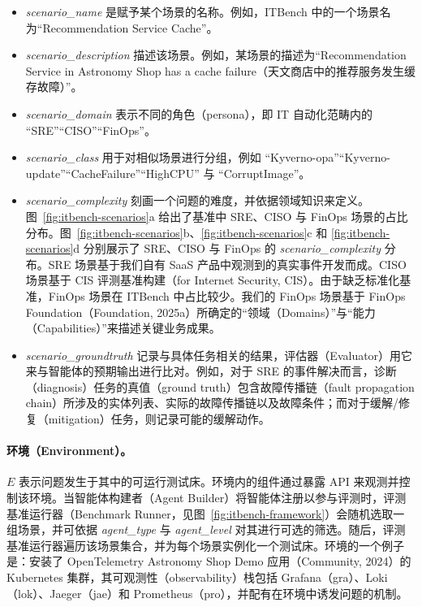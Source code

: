 \begin{itemize}
\item \emph{scenario\_name} 是赋予某个场景的名称。例如，ITBench 中的一个场景名为“Recommendation Service Cache”。
\item \emph{scenario\_description} 描述该场景。例如，某场景的描述为“Recommendation Service in Astronomy Shop has a cache failure（天文商店中的推荐服务发生缓存故障）”。
\item \emph{scenario\_domain} 表示不同的角色（persona），即 IT 自动化范畴内的 “SRE”“CISO”“FinOps”。
\item \emph{scenario\_class} 用于对相似场景进行分组，例如 “Kyverno-opa”“Kyverno-update”“CacheFailure”“HighCPU” 与 “CorruptImage”。
\item \emph{scenario\_complexity} 刻画一个问题的难度，并依据领域知识来定义。图~\ref{fig:itbench-scenarios}a 给出了基准中 SRE、CISO 与 FinOps 场景的占比分布。图~\ref{fig:itbench-scenarios}b、\ref{fig:itbench-scenarios}c 和 \ref{fig:itbench-scenarios}d 分别展示了 SRE、CISO 与 FinOps 的 \emph{scenario\_complexity} 分布。SRE 场景基于我们自有 SaaS 产品中观测到的真实事件开发而成。CISO 场景基于 CIS 评测基准构建（for Internet Security, CIS）。由于缺乏标准化基准，FinOps 场景在 ITBench 中占比较少。我们的 FinOps 场景基于 FinOps Foundation（Foundation, 2025a）所确定的“领域（Domains）”与“能力（Capabilities）”来描述关键业务成果。
\item \emph{scenario\_groundtruth} 记录与具体任务相关的结果，评估器（Evaluator）用它来与智能体的预期输出进行比对。例如，对于 SRE 的事件解决而言，诊断（diagnosis）任务的真值（ground truth）包含故障传播链（fault propagation chain）所涉及的实体列表、实际的故障传播链以及故障条件；而对于缓解/修复（mitigation）任务，则记录可能的缓解动作。
\end{itemize}

\paragraph{环境（Environment）。} $E$ 表示问题发生于其中的可运行测试床。环境内的组件通过暴露 API 来观测并控制该环境。当智能体构建者（Agent Builder）将智能体注册以参与评测时，评测基准运行器（Benchmark Runner，见图~\ref{fig:itbench-framework}）会随机选取一组场景，并可依据 \emph{agent\_type} 与 \emph{agent\_level} 对其进行可选的筛选。随后，评测基准运行器遍历该场景集合，并为每个场景实例化一个测试床。环境的一个例子是：安装了 OpenTelemetry Astronomy Shop Demo 应用（Community, 2024）的 Kubernetes 集群，其可观测性（observability）栈包括 Grafana（gra）、Loki（lok）、Jaeger（jae）和 Prometheus（pro），并配有在环境中诱发问题的机制。

